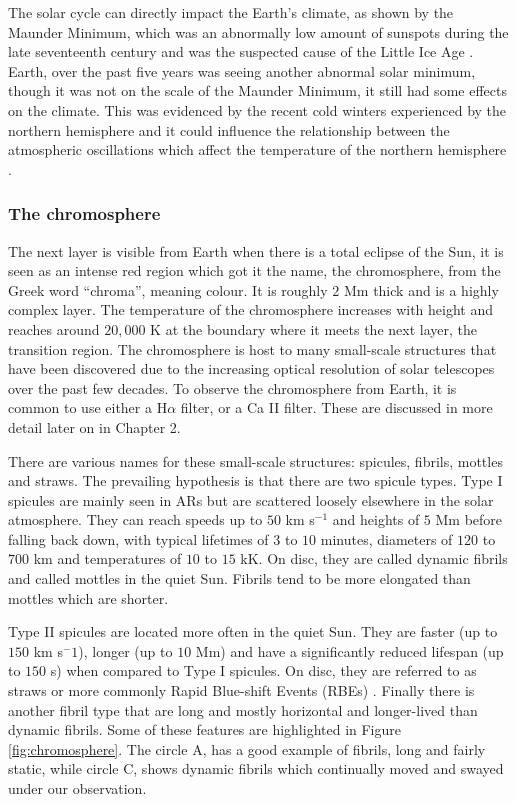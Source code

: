     The solar cycle can directly impact the Earth's climate, as shown by the Maunder Minimum, which was an abnormally low amount of sunspots during the late seventeenth century and was the suspected cause of the Little Ice Age \citep{FRIIS-CHRISTENSEN01111991,climate}.
    Earth, over the past five years was seeing another abnormal solar minimum, though it was not on the scale of the Maunder Minimum, it still had some effects on the climate.
    This was evidenced by the recent cold winters experienced by the northern hemisphere and it could influence the relationship between the atmospheric oscillations which affect the temperature of the northern hemisphere \citep{CWE,NAO,SCR}. 
   
\subsubsection{The chromosphere}
\label{chromo}
    The next layer is visible from Earth when there is a total eclipse of the Sun, it is seen as an intense red region which got it the name, the chromosphere, from the Greek word ``chroma'', meaning colour.
    It is roughly $2$ Mm thick and is a highly complex layer.
    The temperature of the chromosphere increases with height and reaches around $20,000$ K at the boundary where it meets the next layer, the transition region.    
    The chromosphere is host to many small-scale structures that have been discovered due to the increasing optical resolution of solar telescopes over the past few decades.
    To observe the chromosphere from Earth, it is common to use either a H$\alpha$ filter, or a Ca II filter. 
    These are discussed in more detail later on in Chapter 2. 
        
    There are various names for these small-scale structures: spicules, fibrils, mottles and straws.
    The prevailing hypothesis is that there are two spicule types.
    Type I spicules are mainly seen in ARs but are scattered loosely elsewhere in the solar atmosphere.
    They can reach speeds up to $50$ km s$^{-1}$ and heights of $5$ Mm before falling back down, with typical lifetimes of $3$ to $10$ minutes, diameters of $120$ to $700$ km and temperatures of $10$ to $15$ kK.
    On disc, they are called dynamic fibrils and called mottles in the quiet Sun.
    Fibrils tend to be more elongated than mottles which are shorter.
    
    Type II spicules are located more often in the quiet Sun.
    They are faster (up to $150$ km s$^-1$), longer (up to $10$ Mm) and have a significantly reduced lifespan (up to $150$ s) when compared to Type I spicules.
    On disc, they are referred to as straws or more commonly Rapid Blue-shift Events (RBEs) \citep{Zaqarashvili2009}.
    Finally there is another fibril type that are long and mostly horizontal and longer-lived than dynamic fibrils.
    Some of these features are highlighted in Figure \ref{fig:chromosphere}.
    The circle A, has a good example of fibrils, long and fairly static, while circle C, shows dynamic fibrils which continually moved and swayed under our observation.
    
